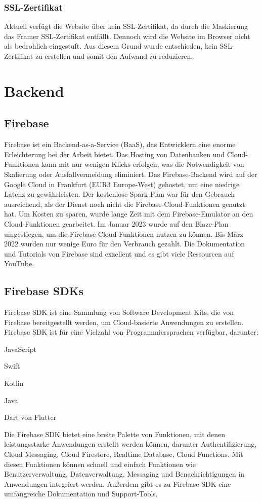 \subsubsection{SSL-Zertifikat}
Aktuell verfügt die Website über kein SSL-Zertifikat, da durch die Maskierung das Framer SSL-Zertifikat entfällt. Dennoch wird die Website im Browser nicht als bedrohlich eingestuft. Aus diesem Grund wurde entschieden, kein SSL-Zertifikat zu erstellen und somit den Aufwand zu reduzieren.

\section{Backend}

\subsection{Firebase}
Firebase ist ein Backend-as-a-Service (BaaS), das Entwicklern eine enorme Erleichterung bei der Arbeit bietet. Das Hosting von Datenbanken und Cloud-Funktionen kann mit nur wenigen Klicks erfolgen, was die Notwendigkeit von Skalierung oder Ausfallvermeidung eliminiert. Das Firebase-Backend wird auf der Google Cloud in Frankfurt (EUR3 Europe-West) gehostet, um eine niedrige Latenz zu gewährleisten. Der kostenlose Spark-Plan war für den Gebrauch ausreichend, als der Dienst noch nicht die Firebase-Cloud-Funktionen genutzt hat. Um Kosten zu sparen, wurde lange Zeit mit dem Firebase-Emulator an den Cloud-Funktionen gearbeitet. Im Januar 2023 wurde auf den Blaze-Plan umgestiegen, um die Firebase-Cloud-Funktionen nutzen zu können. Bis März 2022 wurden nur wenige Euro für den Verbrauch gezahlt. Die Dokumentation und Tutorials von Firebase sind exzellent und es gibt viele Ressourcen auf YouTube.


\subsection{Firebase SDKs}
Firebase SDK ist eine Sammlung von Software Development Kits, die von Firebase bereitgestellt werden, um Cloud-basierte Anwendungen zu erstellen.
Firebase SDK ist für eine Vielzahl von Programmiersprachen verfügbar, darunter:
\begin{compactitem}
  \item JavaScript
  \item Swift
  \item Kotlin
  \item Java
  \item Dart von Flutter
\end{compactitem}
Die Firebase SDK bietet eine breite Palette von Funktionen, mit denen leistungsstarke Anwendungen erstellt werden können, darunter Authentifizierung, Cloud Messaging, Cloud Firestore, Realtime Database, Cloud Functions. Mit diesen Funktionen können schnell und einfach Funktionen wie Benutzerverwaltung, Datenverwaltung, Messaging und Benachrichtigungen in Anwendungen integriert werden. Außerdem gibt es zu Firebase SDK eine umfangreiche Dokumentation und Support-Tools.

